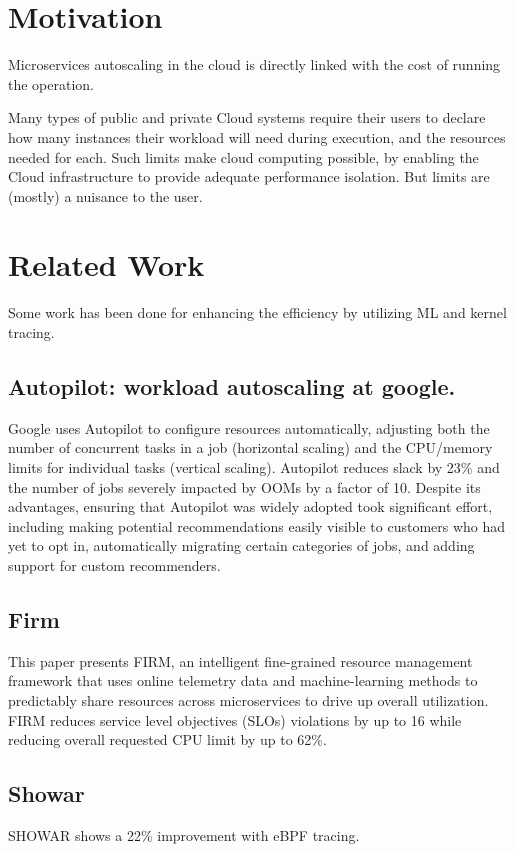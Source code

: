 \documentclass[conference]{IEEEtran}
\begin{document}
\section{Motivation}
Microservices autoscaling in the cloud is directly linked with the cost of running the operation.

Many types of public and private Cloud systems require their users to declare how many instances their workload will need during execution, and the resources needed for each. Such limits make cloud computing possible, by enabling the Cloud infrastructure to provide adequate performance isolation. But limits are (mostly) a nuisance to the user.

\section{Related Work}

Some work has been done for enhancing the efficiency by utilizing ML and kernel tracing.

\subsection{Autopilot: workload autoscaling at google.\cite{b5}}

Google uses Autopilot to configure resources automatically, adjusting both the number of concurrent tasks in a job (horizontal scaling) and the CPU/memory limits for individual tasks (vertical scaling). Autopilot reduces slack by 23\% and the number of jobs severely impacted by OOMs by a factor of 10. Despite its advantages, ensuring that Autopilot was widely adopted took significant effort, including making potential recommendations easily visible to customers who had yet to opt in, automatically migrating certain categories of jobs, and adding support for custom recommenders.

\subsection{Firm}
This paper presents FIRM, an intelligent fine-grained resource management framework that uses online telemetry data and machine-learning methods to predictably share resources across microservices to drive up overall utilization. FIRM reduces service level objectives (SLOs) violations by up to 16 while reducing overall requested CPU limit by up to 62\%.

\subsection{Showar\cite{bShowar}}
SHOWAR shows a 22\% improvement with eBPF tracing.
\end{document}
